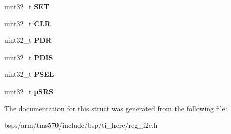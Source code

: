 \begin{DoxyCompactItemize}
uint32\+\_\+t {\bfseries S\+ET}
\item 
\mbox{\label{structtms570__i2c__t_a53ead388b2fbf8cded6b974867da4131}} 
uint32\+\_\+t {\bfseries C\+LR}
\item 
\mbox{\label{structtms570__i2c__t_aaa06edceeca1ef6faa4808a407102823}} 
uint32\+\_\+t {\bfseries P\+DR}
\item 
\mbox{\label{structtms570__i2c__t_a96e211332491d0ac287c516424f9960a}} 
uint32\+\_\+t {\bfseries P\+D\+IS}
\item 
\mbox{\label{structtms570__i2c__t_ab2186b42806b2323530db923b008acd2}} 
uint32\+\_\+t {\bfseries P\+S\+EL}
\item 
\mbox{\label{structtms570__i2c__t_a90f6fa99bccf88396bc16c13ce74190d}} 
uint32\+\_\+t {\bfseries p\+S\+RS}
\end{DoxyCompactItemize}


The documentation for this struct was generated from the following file\+:\begin{DoxyCompactItemize}
\item 
bsps/arm/tms570/include/bsp/ti\+\_\+herc/reg\+\_\+i2c.\+h\end{DoxyCompactItemize}
